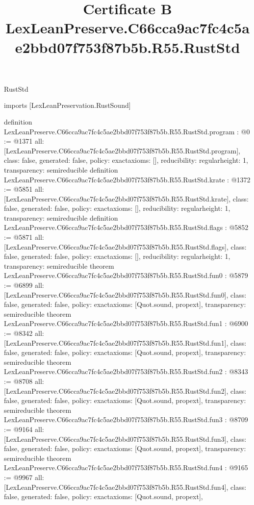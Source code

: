 \begin{lexlean}{RustStd}
\title{Certificate B LexLeanPreserve.C66cca9ac7fc4c5ae2bbd07f753f87b5b.R55.RustStd}
\begin{coremodule}
imports [LexLeanPreservation.RustSound]

definition LexLeanPreserve.C66cca9ac7fc4c5ae2bbd07f753f87b5b.R55.RustStd.program : @0 := @1371 {
  all: [LexLeanPreserve.C66cca9ac7fc4c5ae2bbd07f753f87b5b.R55.RustStd.program],
  class: false,
  generated: false,
  policy: exact{axioms: []},
  reducibility: regular{height: 1},
  transparency: semireducible
}
definition LexLeanPreserve.C66cca9ac7fc4c5ae2bbd07f753f87b5b.R55.RustStd.krate : @1372 := @5851 {
  all: [LexLeanPreserve.C66cca9ac7fc4c5ae2bbd07f753f87b5b.R55.RustStd.krate],
  class: false,
  generated: false,
  policy: exact{axioms: []},
  reducibility: regular{height: 1},
  transparency: semireducible
}
definition LexLeanPreserve.C66cca9ac7fc4c5ae2bbd07f753f87b5b.R55.RustStd.flags : @5852 := @5871 {
  all: [LexLeanPreserve.C66cca9ac7fc4c5ae2bbd07f753f87b5b.R55.RustStd.flags],
  class: false,
  generated: false,
  policy: exact{axioms: []},
  reducibility: regular{height: 1},
  transparency: semireducible
}
theorem LexLeanPreserve.C66cca9ac7fc4c5ae2bbd07f753f87b5b.R55.RustStd.fun0 : @5879 := @6899 {
  all: [LexLeanPreserve.C66cca9ac7fc4c5ae2bbd07f753f87b5b.R55.RustStd.fun0],
  class: false,
  generated: false,
  policy: exact{axioms: [Quot.sound, propext]},
  transparency: semireducible
}
theorem LexLeanPreserve.C66cca9ac7fc4c5ae2bbd07f753f87b5b.R55.RustStd.fun1 : @6900 := @8342 {
  all: [LexLeanPreserve.C66cca9ac7fc4c5ae2bbd07f753f87b5b.R55.RustStd.fun1],
  class: false,
  generated: false,
  policy: exact{axioms: [Quot.sound, propext]},
  transparency: semireducible
}
theorem LexLeanPreserve.C66cca9ac7fc4c5ae2bbd07f753f87b5b.R55.RustStd.fun2 : @8343 := @8708 {
  all: [LexLeanPreserve.C66cca9ac7fc4c5ae2bbd07f753f87b5b.R55.RustStd.fun2],
  class: false,
  generated: false,
  policy: exact{axioms: [Quot.sound, propext]},
  transparency: semireducible
}
theorem LexLeanPreserve.C66cca9ac7fc4c5ae2bbd07f753f87b5b.R55.RustStd.fun3 : @8709 := @9164 {
  all: [LexLeanPreserve.C66cca9ac7fc4c5ae2bbd07f753f87b5b.R55.RustStd.fun3],
  class: false,
  generated: false,
  policy: exact{axioms: [Quot.sound, propext]},
  transparency: semireducible
}
theorem LexLeanPreserve.C66cca9ac7fc4c5ae2bbd07f753f87b5b.R55.RustStd.fun4 : @9165 := @9967 {
  all: [LexLeanPreserve.C66cca9ac7fc4c5ae2bbd07f753f87b5b.R55.RustStd.fun4],
  class: false,
  generated: false,
  policy: exact{axioms: [Quot.sound, propext]},
}
\end{coremodule}
\end{lexlean}
